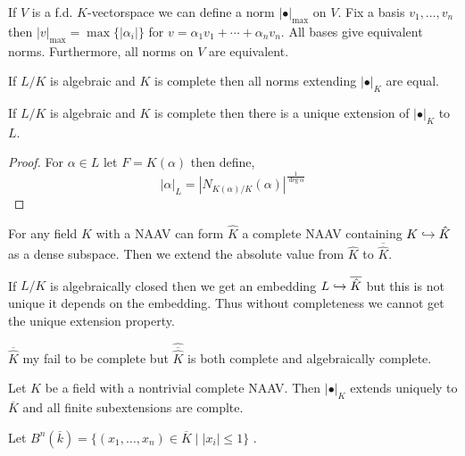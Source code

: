 \documentclass[12pt]{article}
\begin{document}
\begin{prop}
If $V$ is a f.d. $K$-vectorspace we can define a norm $| \bullet |_{\text{max}}$ on $V$. Fix a basis $v_1, \dots, v_n$ then $|v|_{\text{max}} = \max \{ |\alpha_i| \}$ for $v = \alpha_1 v_1 + \cdots + \alpha_n v_n$. All bases give equivalent norms. Furthermore, all norms on $V$ are equivalent.
\end{prop}

\begin{cor}
If $L/K$ is algebraic and $K$ is complete then all norms extending $| \bullet |_K$ are equal. 
\end{cor}

\begin{theorem}
If $L/K$ is algebraic and $K$ is complete then there is a unique extension of $| \bullet |_K$ to $L$. 
\end{theorem}

\begin{proof}
For $\alpha \in L$ let $F = K(\alpha)$ then define,
\[ | \alpha |_{L} = | N_{K(\alpha)/K}(\alpha) |^{\frac{1}{\deg{\alpha}}} \]
\end{proof}

\begin{prop}
For any field $K$ with a NAAV can form $\hat{K}$ a complete NAAV containing $K \hookrightarrow \hat{K}$ as a dense subspace. Then we extend the absolute value from $\hat{K}$ to $\overline{\hat{K}}$. 
\end{prop}

\begin{rmk}
If $L/K$ is algebraically closed then we get an embedding $L \hookrightarrow \overline{\hat{K}}$ but this is not unique it depends on the embedding. Thus without completeness we cannot get the unique extension property.
\end{rmk}

\begin{rmk}
$\overline{\hat{K}}$ my fail to be complete but $\widehat{\overline{\hat{K}}}$ is both complete and algebraically complete. 
\end{rmk}

\begin{prop}
Let $K$ be a field with a nontrivial complete NAAV. Then $| \bullet |_K$ extends uniquely to $\overline{K}$ and all finite subextensions are complte. 
\end{prop}

\begin{defn}
Let $B^n(\overline{k}) = \{ (x_1, \dots, x_n) \in \overline{K} \mid |x_i| \le 1 \}$ .
\end{defn}
\end{document}
